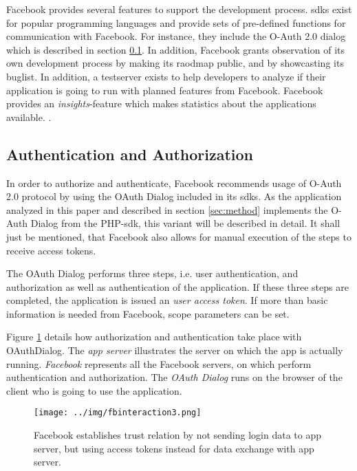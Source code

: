 \documentclass[preprint,12pt]{elsarticle}
\begin{document}
Facebook provides several features to support the development
process. \ac{sdks} exist for popular programming languages and provide
sets of pre-defined functions for communication with Facebook. For
instance, they include the O-Auth 2.0 dialog which is described in
section \ref{sec:auth-auth}. In
addition, Facebook grants observation of its own development process by
making its raodmap  public, and by showcasting  its buglist. In addition, a
testserver exists to help developers to analyze if their application
is going to run with planned features from Facebook. 
Facebook provides an \textit{insights}-feature which makes
statistics about the applications available. \cite{oreilly}.



\subsection{Authentication and Authorization}
\label{sec:auth-auth}
In order to authorize and authenticate, Facebook recommends usage of
O-Auth 2.0 protocol by using the OAuth Dialog included in its
\ac{sdks}. As the application analyzed in this paper and described in section 
\ref{sec:method} implements the O-Auth Dialog from the PHP-\ac{sdk},
this variant will be described in detail. It shall just be mentioned,
that Facebook also allows for manual execution of the steps to receive
access tokens.\cite{facebookDevAuth}  

The OAuth Dialog performs three steps, i.e. user authentication, 
and authorization as well as authentication of the
application. If these three steps are completed, the application is
issued an \textit{user access token}. If more than basic information
is needed from Facebook, scope parameters can be set.\cite{facebookDevAuth}

Figure \ref{fig:authorization} details how authorization and
authentication take place with OAuthDialog. The \textit{app server}
illustrates the server on which the app is actually
running. \textit{Facebook} represents all the Facebook servers, on
which perform authentication and authorization. The \textit{OAuth
  Dialog} runs on the browser of the client who is going to use the
application.


\begin{figure}
\label{fig:authorization}
  \texttt{[image: ../img/fbinteraction3.png]}
  \caption{Facebook establishes trust relation by not sending login
    data to app server, but using access tokens instead for
    data exchange with app server.}
\end{figure}
\end{document}

